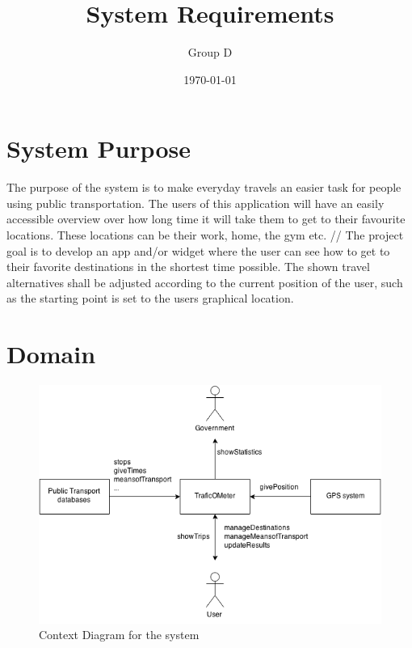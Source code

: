 \documentclass[a4paper]{article}
\title{System Requirements}
\author{Group D}
\date{\today}
\begin{document}
	\maketitle
	\thispagestyle{empty}
	\setcounter{page}{0}
	\pagebreak
	\tableofcontents
	\pagebreak
	

	\section{System Purpose} %
	The purpose of the system is to make everyday travels an easier task for people using public transportation. The users of this application will have an easily accessible overview over how long time it will take them to get to their favourite locations. These locations can be their work, home, the gym etc.
	//
	The project goal is to develop an app and/or widget where the user can see how to get to their favorite destinations in the shortest time possible. The shown travel alternatives shall be adjusted according to the current position of the user, such as the starting point is set to the users graphical location.
	\section{Domain}
		\begin{figure}[h]
			\includegraphics[scale=0.65]{Context-v1.png}
			\caption{Context Diagram for the system}
		\end{figure}
\end{document}
